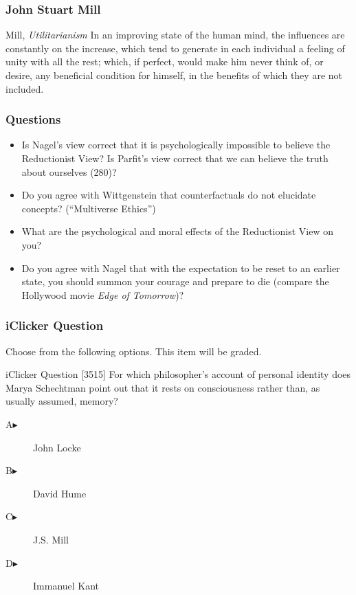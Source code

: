 \documentclass[xcolor=dvipsnames]{beamer}
\begin{document}
\begin{frame}
  \frametitle{John Stuart Mill}
  \begin{block}{Mill, \emph{Utilitarianism}}
    In an improving state of the human mind, the influences are
    constantly on the increase, which tend to generate in each
    individual a feeling of unity with all the rest; which, if
    perfect, would make him never think of, or desire, any beneficial
    condition for himself, in the benefits of which they are not
    included.
  \end{block}
\end{frame}

\begin{frame}
  \frametitle{Questions}
  \begin{itemize}
  \item Is Nagel's view correct that it is psychologically impossible
    to believe the Reductionist View? Is Parfit's view correct that we
    can believe the truth about ourselves (280)?
  \item Do you agree with Wittgenstein that counterfactuals do not
    elucidate concepts? (``Multiverse Ethics'')
  \item What are the psychological and moral effects of the
    Reductionist View on you?
  \item Do you agree with Nagel that with the expectation to be reset
    to an earlier state, you should summon your courage and prepare to
    die (compare the Hollywood movie \emph{Edge of Tomorrow})?
  \end{itemize}
\end{frame}

\begin{frame}
  \frametitle{iClicker Question}
Choose from the following options. This item will be graded.
\begin{block}{iClicker Question}
[3515] For which philosopher's account of personal identity does Marya
Schechtman point out that it rests on consciousness rather than, as
usually assumed, memory?
\end{block}
\begin{description}
\item[A\hspace{.2in}$\blacktriangleright$] John Locke
\item[B\hspace{.2in}$\blacktriangleright$] David Hume
\item[C\hspace{.2in}$\blacktriangleright$] J.S. Mill
\item[D\hspace{.2in}$\blacktriangleright$] Immanuel Kant
\end{description}
\end{frame}
\end{document}
